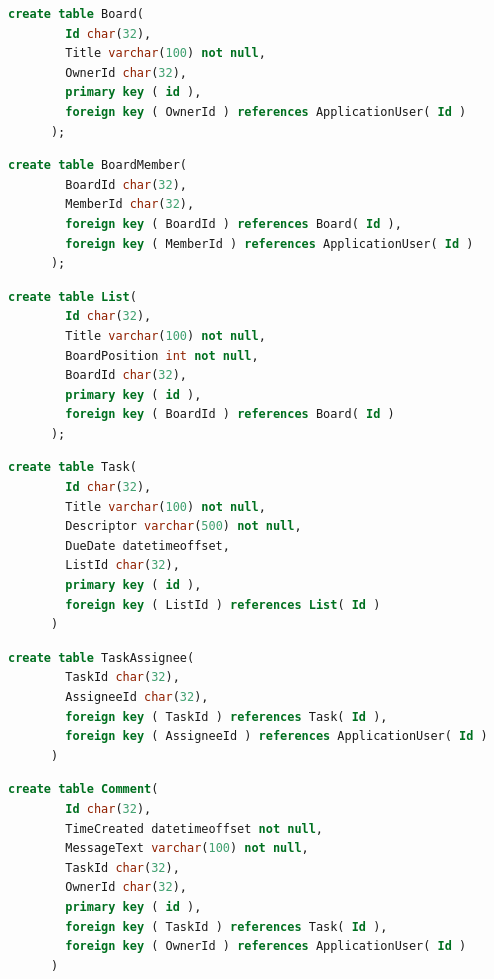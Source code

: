 \documentclass[letterpaper]{article}
\begin{document}
    \begin{lstlisting}[language=SQL, caption=Board Table Creation Statement]
      create table Board(
        Id char(32),
        Title varchar(100) not null,
        OwnerId char(32),
        primary key ( id ),
        foreign key ( OwnerId ) references ApplicationUser( Id )
      );
    \end{lstlisting}

    \begin{lstlisting}[language=SQL, caption=BoardMember Table Creation Statement]
      create table BoardMember(
        BoardId char(32),
        MemberId char(32),
        foreign key ( BoardId ) references Board( Id ),
        foreign key ( MemberId ) references ApplicationUser( Id )
      );
    \end{lstlisting}

    \begin{lstlisting}[language=SQL, caption=List Table Creation Statement]
      create table List(
        Id char(32),
        Title varchar(100) not null,
        BoardPosition int not null,
        BoardId char(32),
        primary key ( id ),
        foreign key ( BoardId ) references Board( Id )
      );
    \end{lstlisting}
    \pagebreak
    \begin{lstlisting}[language=SQL, caption=Task Table Creation Statement]
      create table Task(
        Id char(32),
        Title varchar(100) not null,
        Descriptor varchar(500) not null,
        DueDate datetimeoffset,
        ListId char(32),
        primary key ( id ),
        foreign key ( ListId ) references List( Id )
      )
    \end{lstlisting}
    \begin{lstlisting}[language=SQL, caption=TaskAssignee Table Creation Statement]
      create table TaskAssignee(
        TaskId char(32),
        AssigneeId char(32),
        foreign key ( TaskId ) references Task( Id ),
        foreign key ( AssigneeId ) references ApplicationUser( Id )
      )
    \end{lstlisting}
    \begin{lstlisting}[language=SQL, caption=Comment Table Creation Statement]
      create table Comment(
        Id char(32),
        TimeCreated datetimeoffset not null,
        MessageText varchar(100) not null,
        TaskId char(32),
        OwnerId char(32),
        primary key ( id ),
        foreign key ( TaskId ) references Task( Id ),
        foreign key ( OwnerId ) references ApplicationUser( Id )
      )
    \end{lstlisting}
    \pagebreak
\end{document}
